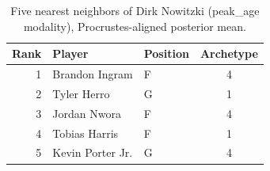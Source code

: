 \begin{table}[htbp]
  \centering\small
  \begin{tabular}{rllc}
    \toprule
    Rank & Player & Position & Archetype \\
    \midrule
    1 & Brandon Ingram & F & 4 \\
    2 & Tyler Herro & G & 1 \\
    3 & Jordan Nwora & F & 4 \\
    4 & Tobias Harris & F & 1 \\
    5 & Kevin Porter Jr. & G & 4 \\
    \bottomrule
  \end{tabular}
  \caption{Five nearest neighbors of Dirk Nowitzki (peak_age modality), Procrustes-aligned posterior mean.}
  \label{tab:Dirk_Nowitzki_neighbors_peak_age}
\end{table}

